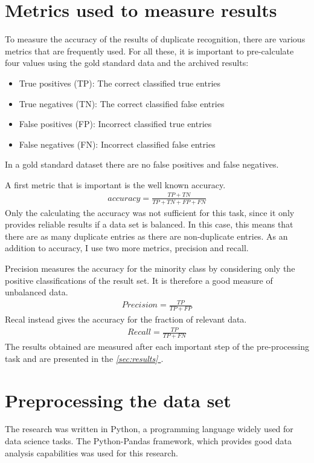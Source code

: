\documentclass[conference]{IEEEtran}
\newcommand*{\fullref}[1]{\textit{\hyperref[{#1}]{\autoref*{#1} \nameref*{#1}}}}
\begin{document}
\section{Metrics used to measure results} \label{sec:metrics}
To measure the accuracy of the results of duplicate recognition, there are various metrics that are frequently used. For all these, it is important to pre-calculate four values using the gold standard data and the archived results:  
\begin{itemize}
	\item True positives (TP): The correct classified true entries
	\item True negatives (TN): The correct classified false entries
	\item False positives (FP): Incorrect classified true entries
	\item False negatives (FN): Incorrect classified false entries
\end{itemize}
In a gold standard dataset there are no false positives and false negatives\cite{bib:reach_for_gold}.

A first metric that is important is the well known accuracy. 
\begin{align}
 accuracy =  \frac{TP + TN}{TP + TN + FP + FN}
\end{align}
Only the calculating the accuracy was not sufficient for this task, since it only provides reliable results if a data set is balanced. In this case, this means that there are as many duplicate entries as there are non-duplicate entries. As an addition to accuracy, I use two more metrics, precision and recall.

Precision measures the accuracy for the minority class by considering only the positive classifications of the result set. It is therefore a good measure of unbalanced data.
\begin{align}
	Precision = \frac{TP}{TP + FP}
\end{align}
Recal instead gives the accuracy for the fraction of relevant data.
\begin{align}
	Recall = \frac{TP}{TP + FN}
\end{align}
The results obtained are measured after each important step of the pre-processing task and are presented in the \fullref{sec:results}.
\section{Preprocessing the data set} \label{sec_methods}
The research was written in Python, a programming language widely used for data science tasks. The Python-Pandas framework, which provides good data analysis capabilities was used for this research\cite{bib:pandas_doc}.
\end{document}
